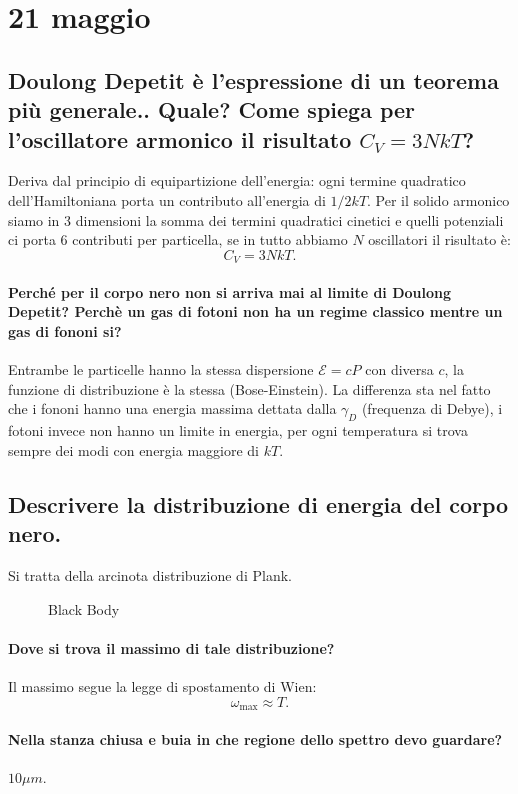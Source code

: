 \section{21 maggio}%
\label{sub:21 maggio}
\subsection{Doulong Depetit è l'espressione di un teorema più generale.. Quale? Come spiega per l'oscillatore armonico il risultato $C_V = 3NkT$?}%
Deriva dal principio di equipartizione dell'energia: ogni termine quadratico dell'Hamiltoniana porta un contributo all'energia di $1 /2 kT$. Per il solido armonico siamo in 3 dimensioni la somma dei termini quadratici cinetici e quelli potenziali ci porta 6 contributi per particella, se in tutto abbiamo $N$ oscillatori il risultato è:
\[
    C_V = 3NkT
.\] 
\paragraph{Perché per il corpo nero non si arriva mai al limite di Doulong Depetit? Perchè un gas di fotoni non ha un regime classico mentre un gas di fononi si?}%
\label{par:Perchè per il corpo nero non si arriva mai al limite di Doulong Depetit?}
Entrambe le particelle hanno la stessa dispersione $\mathcal{E}  = c P$ con diversa $c$, la funzione di distribuzione è la stessa (Bose-Einstein). 
La differenza sta nel fatto che i fononi hanno una energia massima dettata dalla $\gamma_D$ (frequenza di Debye), i fotoni invece non hanno un limite in energia, per ogni temperatura si trova sempre dei modi con energia maggiore di $kT$.
\subsection{Descrivere la distribuzione di energia del corpo nero.}%
Si tratta della arcinota distribuzione di Plank.
\begin{figure}[ht]
    \centering
    \caption{Black Body}
    \label{fig:black-body}
\end{figure}
\paragraph{Dove si trova il massimo di tale distribuzione?}%
Il massimo segue la legge di spostamento di Wien:
\[
    \omega_\text{max} \approx  T
.\] 
\paragraph{Nella stanza chiusa e buia in che regione dello spettro devo guardare?}%
\label{par:Nella stanza chiusa e buia in che regione dello spettro devo guardare?}
 $10 \mu m$.

